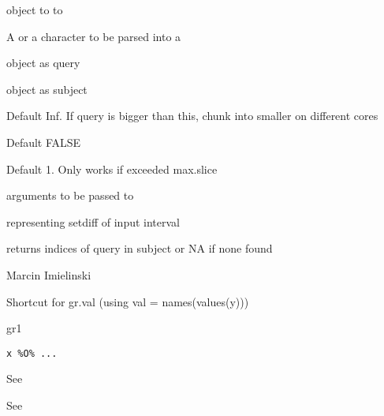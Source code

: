 \documentclass[a4paper]{book}
\begin{document}
%
\begin{Arguments}
\begin{ldescription}
\item[\code{x}]  object to to

\item[\code{...}] A  or a character to be parsed into a 

\item[\code{query}]  object as query

\item[\code{subject}]  object as subject

\item[\code{max.slice}] Default Inf. If query is bigger than this, chunk into smaller on different cores

\item[\code{verbose}] Default FALSE

\item[\code{mc.cores}] Default 1. Only works if exceeded max.slice

\item[\code{...}] arguments to be passed to 
\end{ldescription}
\end{Arguments}
%
\begin{Value}
 representing setdiff of input interval

returns indices of query in subject or NA if none found
\end{Value}
%
\begin{Author}\relax
Marcin Imielinski
\end{Author}
%
\begin{Description}\relax
Shortcut for gr.val (using val = names(values(y)))

gr1 
\end{Description}
%
\begin{Usage}
\begin{verbatim}
x %O% ...
\end{verbatim}
\end{Usage}
%
\begin{Arguments}
\begin{ldescription}
\item[\code{x}] See 

\item[\code{...}] See 
\end{ldescription}
\end{Arguments}
\end{document}
